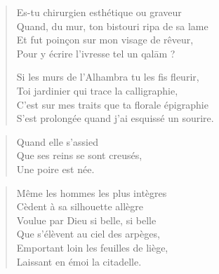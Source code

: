 \begin{verse}\quatrain
  Es-tu chirurgien esthétique ou graveur\\ 
  Quand, du mur, ton bistouri ripa de sa lame\\ 
  Et fut poinçon sur mon visage de rêveur,\\ 
  Pour y écrire l’ivresse tel un qalām ? %

  Si les murs de l’Alhambra tu les fis fleurir,\\ 
  Toi jardinier qui trace la calligraphie,\\ 
  C’est sur mes traits que ta florale épigraphie\\ 
  S’est prolongée quand j’ai esquissé un sourire. %
\end{verse}

\begin{verse}\haiku
  Quand elle s’assied\\  %
  Que ses  reins se sont creusés,\\  %
  Une poire est née.
\end{verse}

\begin{verse}\sizain
  Même les hommes les plus intègres\\ 
  Cèdent à sa silhouette allègre\\ 
  Voulue par Dieu si belle, si belle\\ 
  Que s’élèvent au ciel des arpèges,\\ 
  Emportant loin les feuilles de liège,\\ 
  Laissant en émoi la citadelle. %
\end{verse}

